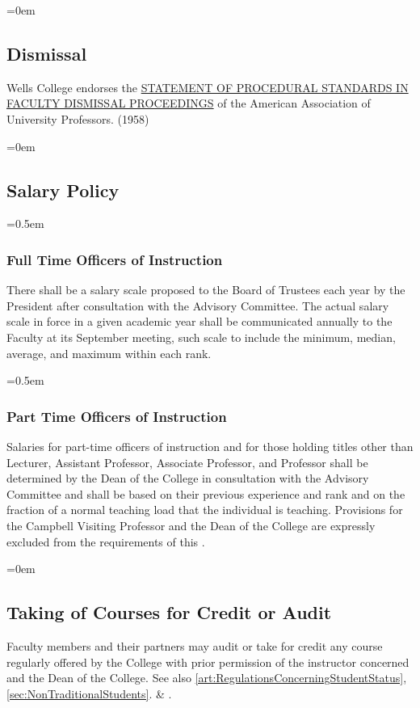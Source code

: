 \documentclass{manual}
\let\oldsubsection\subsection
\renewcommand\subsection{\leftskip=0em\oldsubsection}
\let\oldsubsubsection\subsubsection
\renewcommand\subsubsection{\leftskip=0.5em\oldsubsubsection}
\begin{document}
\subsection{Dismissal}\label{sec:Dismissal}
Wells College endorses the \href{http://www.aaup.org/AAUP/pubsres/policydocs/contents/statementon+proceduralstandardsinFaculty+dismissal+proceedings.htm}{STATEMENT OF PROCEDURAL STANDARDS IN FACULTY DISMISSAL PROCEEDINGS} of the American Association of University Professors. (1958)

\subsection{Salary Policy}\label{sec:SalaryPolicy}

\subsubsection{Full Time Officers of Instruction}
There shall be a salary scale proposed to the Board of Trustees each year by the President after consultation with the Advisory Committee.
The actual salary scale in force in a given academic year shall be communicated annually to the Faculty at its September meeting, such scale to include the minimum, median, average, and maximum within each rank.

\subsubsection{Part Time Officers of Instruction}
Salaries for part-time officers of instruction and for those holding titles other than Lecturer, Assistant Professor, Associate Professor, and Professor shall be determined by the Dean of the College in consultation with the Advisory Committee and shall be based on their previous experience and rank and on the fraction of a normal teaching load that the individual is teaching. Provisions for the Campbell Visiting Professor and the Dean of the College are expressly excluded from the requirements of this .

\subsection{Taking of Courses for Credit or Audit}
Faculty members and their partners may audit or take for credit any course regularly offered by the College with prior permission of the instructor concerned and the Dean of the College. See also \cref{art:RegulationsConcerningStudentStatus}, \cref{sec:NonTraditionalStudents}.  \& .
\end{document}
